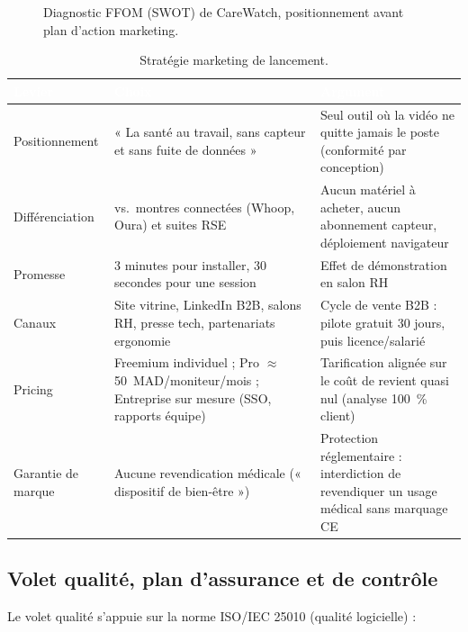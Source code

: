 \documentclass[11pt,a4paper]{article}
\begin{document}
\begin{figure}[H]
{}
\caption{Diagnostic FFOM (SWOT) de CareWatch, positionnement avant plan d'action marketing.}
\label{fig:swot}
\end{figure}

\begin{table}[H]
\centering\small
\begin{tabularx}{\linewidth}{p{3.4cm} p{3.6cm} X}
\toprule
\rowcolor{cwblue} \textcolor{white}{\bf Levier} & \textcolor{white}{\bf Choix} & \textcolor{white}{\bf
Argument} \\
\midrule
Positionnement & « La santé au travail, sans capteur et sans fuite de données » & Seul outil où la vidéo
 ne quitte jamais le poste (conformité par conception) \\
Différenciation & vs.\ montres connectées (Whoop, Oura) et suites RSE & Aucun matériel à acheter, aucun
 abonnement capteur, déploiement navigateur \\
Promesse & 3 minutes pour installer, 30 secondes pour une session & Effet de démonstration en salon RH \\
Canaux & Site vitrine, LinkedIn B2B, salons RH, presse tech, partenariats ergonomie & Cycle de vente B2B :
 pilote gratuit 30 jours, puis licence/salarié \\
Pricing & Freemium individuel ; Pro $\approx$ 50~MAD/moniteur/mois ; Entreprise sur mesure (SSO,
 rapports équipe) & Tarification alignée sur le coût de revient quasi nul (analyse 100~\% client) \\
Garantie de marque & Aucune revendication médicale (« dispositif de bien-être ») & Protection
 réglementaire : interdiction de revendiquer un usage médical sans marquage CE \\
\bottomrule
\end{tabularx}
\caption{Stratégie marketing de lancement.}
\label{tab:marketing}
\end{table}

\subsection{Volet qualité, plan d'assurance et de contrôle}
Le volet qualité s'appuie sur la norme ISO/IEC 25010 (qualité logicielle) \cite{iso25010} :
\end{document}
